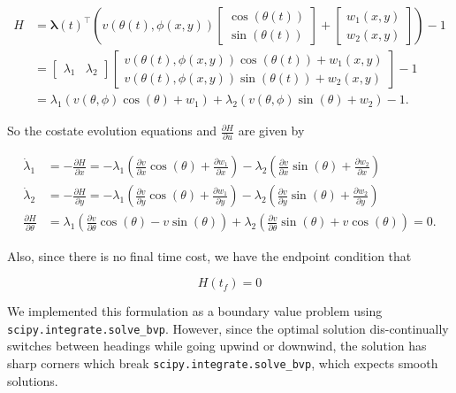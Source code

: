\documentclass[11pt]{amsart}
\begin{document}
$$ 
\begin{aligned}
    H &= \boldsymbol{\lambda}(t)^\top \left(v(\theta(t), \phi(x, y)) \begin{bmatrix} \cos(\theta(t)) \\ \sin(\theta(t)) \end{bmatrix} + \begin{bmatrix} w_1(x, y) \\ w_2(x, y) \end{bmatrix}\right) - 1 \\
    &= \begin{bmatrix} \lambda_1 & \lambda_2 \end{bmatrix}  \begin{bmatrix} v(\theta(t), \phi(x, y)) \cos(\theta(t)) + w_1(x, y) \\ v(\theta(t), \phi(x, y)) \sin(\theta(t)) + w_2(x, y) \end{bmatrix} - 1 \\
    &= \lambda_1(v(\theta, \phi)\cos(\theta) + w_1)+ \lambda_2(v(\theta, \phi)\sin(\theta) + w_2) - 1.
\end{aligned}
$$

\par So the costate evolution equations and $\frac{\partial H}{\partial u}$ are given by

$$
\begin{aligned}
    \dot{\lambda}_1 &= -\frac{\partial H}{\partial x} = -\lambda_1 \left ( \frac{\partial v}{\partial x} \cos(\theta) + \frac{\partial w_1}{\partial x} \right ) - \lambda_2 \left ( \frac{\partial v}{\partial x} \sin(\theta) + \frac{\partial w_2}{\partial x} \right ) \\
    \dot{\lambda}_2 &= -\frac{\partial H}{\partial y} = -\lambda_1 \left ( \frac{\partial v}{\partial y} \cos(\theta) + \frac{\partial w_1}{\partial y} \right ) - \lambda_2 \left ( \frac{\partial v}{\partial y} \sin(\theta) + \frac{\partial w_2}{\partial y} \right ) \\
    \frac{\partial H}{\partial \theta} &= \lambda_1 \left (\frac{\partial v}{\partial \theta} \cos(\theta) - v \sin(\theta) \right ) + \lambda_2 \left (\frac{\partial v}{\partial \theta} \sin(\theta) + v \cos(\theta) \right ) = 0.
\end{aligned}
$$

Also, since there is no final time cost, we have the endpoint condition that 

$$H(t_f) = 0$$

\par We implemented this formulation as a boundary value problem using \texttt{scipy.integrate.solve\_bvp}. However, since the optimal solution dis-continually switches between headings while going upwind or downwind, the solution has sharp corners which break \texttt{scipy.integrate.solve\_bvp}, which expects smooth solutions.
\end{document}
